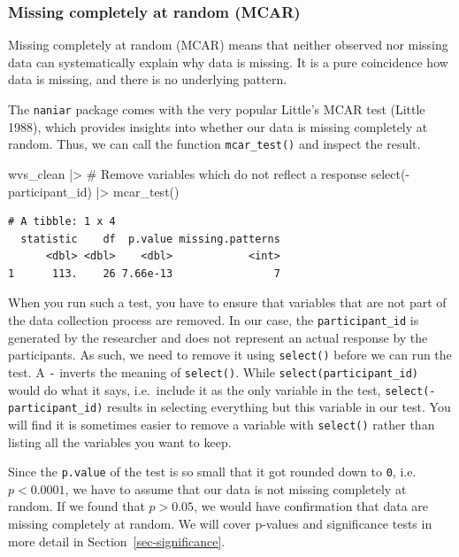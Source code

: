 \documentclass[
  letterpaper,
]{krantz}
\makeatletter
\newenvironment{Shaded}{\begin{snugshade}}{\end{snugshade}}
\newcommand{\CommentTok}[1]{\textcolor[rgb]{0.37,0.37,0.37}{#1}}
\newcommand{\FunctionTok}[1]{\textcolor[rgb]{0.28,0.35,0.67}{#1}}
\newcommand{\NormalTok}[1]{\textcolor[rgb]{0.00,0.23,0.31}{#1}}
\newcommand{\SpecialCharTok}[1]{\textcolor[rgb]{0.37,0.37,0.37}{#1}}
\newenvironment{kframe}{%
\medskip{}
\setlength{\fboxsep}{.8em}
 \def\at@end@of@kframe{}%
 \ifinner\ifhmode%
  \def\at@end@of@kframe{\end{minipage}}%
  \begin{minipage}{\columnwidth}%
 \fi\fi%
 \def\FrameCommand##1{\hskip\@totalleftmargin \hskip-\fboxsep
 \colorbox{shadecolor}{##1}\hskip-\fboxsep
     \hskip-\linewidth \hskip-\@totalleftmargin \hskip\columnwidth}%
 \MakeFramed {\advance\hsize-\width
   \@totalleftmargin\z@ \linewidth\hsize
   \@setminipage}}%
 {\par\unskip\endMakeFramed%
 \at@end@of@kframe}
\renewenvironment{Shaded}{\begin{kframe}}{\end{kframe}}
\makeatother
\begin{document}
\subsubsection{Missing completely at random
(MCAR)}\label{sec-missing-completetly-at-random-mcar}

Missing completely at random (MCAR) means that neither observed nor
missing data can systematically explain why data is missing. It is a
pure coincidence how data is missing, and there is no underlying
pattern.

The \texttt{naniar} package comes with the very popular Little's MCAR
test (Little 1988), which provides insights into whether our data is
missing completely at random. Thus, we can call the function
\texttt{mcar\_test()} and inspect the result.

\begin{Shaded}
\begin{Highlighting}[]
\NormalTok{wvs\_clean }\SpecialCharTok{|\textgreater{}}
  \CommentTok{\# Remove variables which do not reflect a response}
  \FunctionTok{select}\NormalTok{(}\SpecialCharTok{{-}}\NormalTok{participant\_id) }\SpecialCharTok{|\textgreater{}}
  \FunctionTok{mcar\_test}\NormalTok{()}
\end{Highlighting}
\end{Shaded}

\begin{verbatim}
# A tibble: 1 x 4
  statistic    df  p.value missing.patterns
      <dbl> <dbl>    <dbl>            <int>
1      113.    26 7.66e-13                7
\end{verbatim}

When you run such a test, you have to ensure that variables that are not
part of the data collection process are removed. In our case, the
\texttt{participant\_id} is generated by the researcher and does not
represent an actual response by the participants. As such, we need to
remove it using \texttt{select()} before we can run the test. A
\texttt{-} inverts the meaning of \texttt{select()}. While
\texttt{select(participant\_id)} would do what it says, i.e.~include it
as the only variable in the test, \texttt{select(-participant\_id)}
results in selecting everything but this variable in our test. You will
find it is sometimes easier to remove a variable with \texttt{select()}
rather than listing all the variables you want to keep.

Since the \texttt{p.value} of the test is so small that it got rounded
down to \texttt{0}, i.e.~\(p<0.0001\), we have to assume that our data
is not missing completely at random. If we found that \(p>0.05\), we
would have confirmation that data are missing completely at random. We
will cover p-values and significance tests in more detail in
Section~\ref{sec-significance}.
\end{document}
